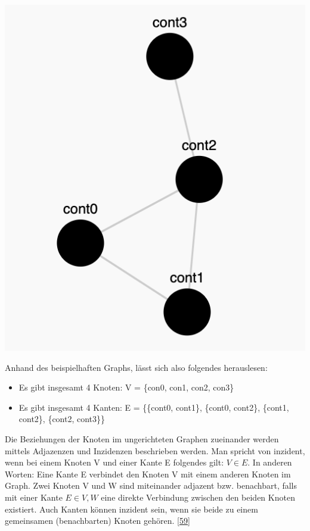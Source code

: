 \documentclass[
    headings=optiontotocandhead,%
    twoside,
    numbers=noenddot,%
    12pt, %
    titlepage, %
    parskip=full, %
    listof=leveldown, 
    numbers=noenddot, %
    a4paper,DIV=14,
    BCOR=15mm,
]{scrbook}
\let\origfigure=\figure
\let\endorigfigure=\endfigure
\renewenvironment{figure}[1][]{%
   \origfigure[H]
}{%
   \endorigfigure
}
\providecommand{\tightlist}{%
  \setlength{\itemsep}{0pt}\setlength{\parskip}{0pt}}
\begin{document}
\begin{figure}
\centering
\includegraphics{img/Gekle/GraphExample.png}
\caption{Beispiel eines ungerichteten Graphen}
\end{figure}

Anhand des beispielhaften Graphs, lässt sich also folgendes herauslesen:

\begin{itemize}
\tightlist
\item
  Es gibt insgesamt 4 Knoten: V = \{con0, con1, con2, con3\}
\item
  Es gibt insgesamt 4 Kanten: E = \{\{cont0, cont1\}, \{cont0, cont2\},
  \{cont1, cont2\}, \{cont2, cont3\}\}
\end{itemize}

Die Beziehungen der Knoten im ungerichteten Graphen zueinander werden
mittels Adjazenzen und Inzidenzen beschrieben werden. Man spricht von
inzident, wenn bei einem Knoten V und einer Kante E folgendes gilt:
\(V \in E\). In anderen Worten: Eine Kante E verbindet den Knoten V mit
einem anderen Knoten im Graph. Zwei Knoten V und W sind miteinander
adjazent bzw. benachbart, falls mit einer Kante \(E \in {V, W}\) eine
direkte Verbindung zwischen den beiden Knoten existiert. Auch Kanten
können inzident sein, wenn sie beide zu einem gemeinsamen (benachbarten)
Knoten gehören.
{[}\protect\hyperlink{ref-Uni-Bremen-Graphentheorie}{59}{]}
\end{document}
